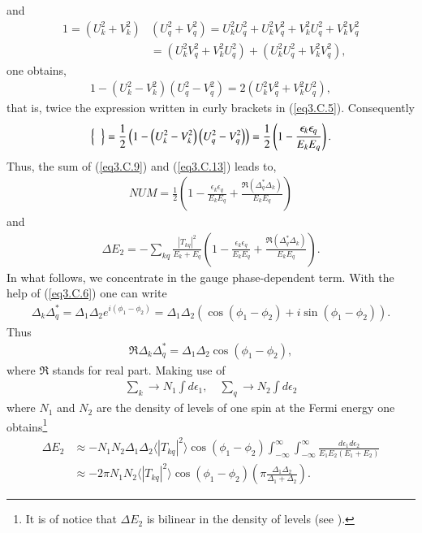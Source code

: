 and
\begin{align}
\nonumber 1=\left(U_k^2+V_k^2\right)&\left(U_q^2+V_q^2\right)=U_k^2U_q^2+U_k^2V_q^2+V_k^2U_q^2+V_k^2V_q^2\\
&=\left(U_k^2V_q^2+V_k^2U_q^2\right)+\left(U_k^2U_q^2+V_k^2V_q^2\right),
\end{align}
one obtains,
\begin{align}
1-\left(U_k^2-V_k^2\right)\left(U_q^2-V_q^2\right)=2\left(U_k^2V_q^2+V_k^2U_q^2\right),
\end{align}
that is, twice the expression written in curly brackets in (\ref{eq3.C.5}). Consequently
\begin{align}\label{eq3.C.13}
\left\{\vphantom{\left(U_q^2-V_q^2\right)}\;\;\right\}=\frac{1}{2}\left(1-\left(U_k^2-V_k^2\right)\left(U_q^2-V_q^2\right)\right)=\frac{1}{2}\left(1-\frac{\epsilon_k\epsilon_q}{E_kE_q}\right).
\end{align}
Thus, the sum of (\ref{eq3.C.9}) and (\ref{eq3.C.13}) leads to,
\begin{align}
NUM=\frac{1}{2}\left(1-\frac{\epsilon_k\epsilon_q}{E_kE_q}+\frac{\Re(\Delta_q^*\Delta_k)}{E_kE_q}\right)
\end{align}
and
\begin{align}
\Delta E_2=-\sum_{kq}\frac{|T_{kq}|^2}{E_k+E_q}\left(1-\frac{\epsilon_k\epsilon_q}{E_kE_q}+\frac{\Re(\Delta_q^*\Delta_k)}{E_kE_q}\right).
\end{align}
In what follows, we concentrate in the gauge phase-dependent term. With the help of (\ref{eq3.C.6}) one can write
\begin{align}
\Delta_k\Delta_q^*=\Delta_1\Delta_2e^{i(\phi_1-\phi_2)}=\Delta_1\Delta_2\left(\cos(\phi_1-\phi_2)+i\sin(\phi_1-\phi_2)\right).
\end{align}
Thus
\begin{align}
\Re\Delta_k\Delta_q^*=\Delta_1\Delta_2\cos(\phi_1-\phi_2),
\end{align}
where $\Re$ stands for real part. Making use of
\begin{align}
\sum_k\rightarrow N_1\int d\epsilon_1,\quad\sum_q\rightarrow N_2\int d\epsilon_2
\end{align}
where $N_1$ and $N_2$ are the density of levels of one spin at the Fermi energy one  obtains\footnote{It is of notice that $\Delta E_2$ is bilinear in the density of levels (see \cite{Potel:17}).}
\begin{align}\label{eq3.6.19}
\nonumber\Delta E_2&\approx-N_1N_2\Delta_1 \Delta_2 \langle|T_{kq}|^2\rangle \cos(\phi_1-\phi_2)\int_{-\infty}^{\infty}\int_{-\infty}^{\infty}\frac{d\epsilon_1 d\epsilon_2}{E_1 E_2(E_1+E_2)}\\
&\approx -2\pi N_1 N_2 \langle|T_{kq}|^2\rangle \cos(\phi_1-\phi_2) \left(\pi\frac{\Delta_1\Delta_2}{\Delta_1+\Delta_2}\right).
\end{align}
